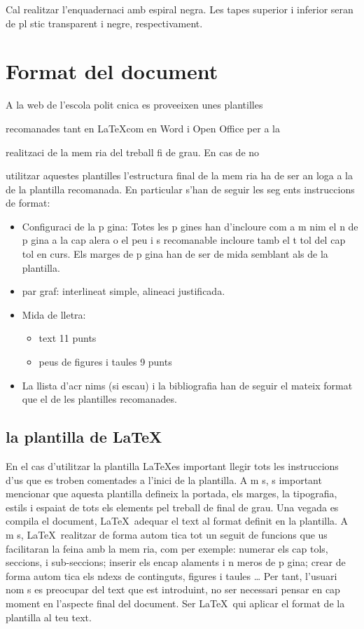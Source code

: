 Cal realitzar l'enquadernaci  amb espiral negra. Les tapes superior i inferior seran de pl stic transparent i negre, respectivament.

\section{Format del document}
A la web de l'escola polit cnica es proveeixen unes plantilles


recomanades tant en  \LaTeX  com en Word i Open Office per a la


realitzaci  de la mem ria del treball fi de grau. En cas de no



utilitzar aquestes plantilles l'estructura final de la mem ria ha de ser an loga a la de la plantilla recomanada. En particular s'han de seguir les seg ents instruccions de format:

\begin{itemize}
\item Configuraci  de la p gina: Totes les p gines han d'incloure com a m nim el n  de p gina a la cap alera o el peu i  s recomanable incloure tamb  el t tol del cap tol en curs. Els marges de p gina han de ser de mida semblant als de la plantilla.
\item par graf: interlineat simple, alineaci  justificada.
\item Mida de lletra: 
\begin{itemize}
\item text 11 punts
\item peus de figures i taules 9 punts
\end{itemize}
\item La llista d'acr nims (si escau) i la bibliografia han de seguir el mateix format que el de les plantilles recomanades.
\end{itemize}

\subsection{la plantilla de \LaTeX }
En el cas d'utilitzar la plantilla  \LaTeX es important llegir tots les instruccions d'us que es troben comentades a l'inici de la plantilla. A m s,  s important mencionar que aquesta plantilla defineix la portada, els marges, la tipografia, estils i espaiat de tots els elements pel treball de final de
grau. Una vegada es compila el document, \LaTeX\  adequar  el text al format definit en la plantilla. A m s, \LaTeX\ realitzar  de forma
autom tica tot un seguit de funcions que us facilitaran la feina amb la mem ria, com per exemple: numerar els cap tols, seccions, i
sub-seccions; inserir els encap alaments i n meros de p gina; crear de forma autom tica els  ndexs de continguts, figures i taules \dots
Per tant, l'usuari nom s es preocupar  del text que est  introduint, no ser  necessari pensar en cap moment en l'aspecte final del
document. Ser  \LaTeX\ qui aplicar  el format de la plantilla al teu text.

